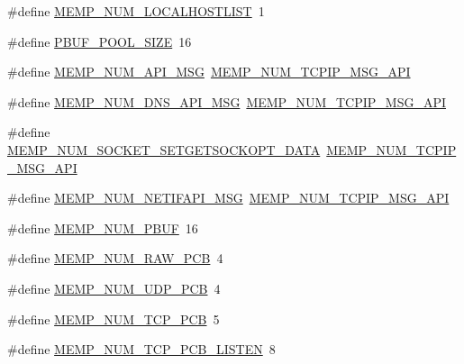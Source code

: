 \begin{DoxyCompactItemize}
\#define \hyperlink{group__lwip__opts__memp_gaa9b0f949da12cbe8fe5f7aefc30290e0}{M\+E\+M\+P\+\_\+\+N\+U\+M\+\_\+\+L\+O\+C\+A\+L\+H\+O\+S\+T\+L\+I\+ST}~1
\item 
\#define \hyperlink{group__lwip__opts__memp_ga50eaadc4cad0716410332691e382c38a}{P\+B\+U\+F\+\_\+\+P\+O\+O\+L\+\_\+\+S\+I\+ZE}~16
\item 
\#define \hyperlink{group__lwip__opts__memp_ga5a95abf3610c56e7c23cb035eb9c3444}{M\+E\+M\+P\+\_\+\+N\+U\+M\+\_\+\+A\+P\+I\+\_\+\+M\+SG}~\hyperlink{group__lwip__opts__memp_gafbbfd6ce8536038cd00fa85bebae987c}{M\+E\+M\+P\+\_\+\+N\+U\+M\+\_\+\+T\+C\+P\+I\+P\+\_\+\+M\+S\+G\+\_\+\+A\+PI}
\item 
\#define \hyperlink{group__lwip__opts__memp_ga3b1f228c598529c62895ad04ff294980}{M\+E\+M\+P\+\_\+\+N\+U\+M\+\_\+\+D\+N\+S\+\_\+\+A\+P\+I\+\_\+\+M\+SG}~\hyperlink{group__lwip__opts__memp_gafbbfd6ce8536038cd00fa85bebae987c}{M\+E\+M\+P\+\_\+\+N\+U\+M\+\_\+\+T\+C\+P\+I\+P\+\_\+\+M\+S\+G\+\_\+\+A\+PI}
\item 
\#define \hyperlink{group__lwip__opts__memp_gacf9782dd26bf8a655044dc041a9de948}{M\+E\+M\+P\+\_\+\+N\+U\+M\+\_\+\+S\+O\+C\+K\+E\+T\+\_\+\+S\+E\+T\+G\+E\+T\+S\+O\+C\+K\+O\+P\+T\+\_\+\+D\+A\+TA}~\hyperlink{group__lwip__opts__memp_gafbbfd6ce8536038cd00fa85bebae987c}{M\+E\+M\+P\+\_\+\+N\+U\+M\+\_\+\+T\+C\+P\+I\+P\+\_\+\+M\+S\+G\+\_\+\+A\+PI}
\item 
\#define \hyperlink{group__lwip__opts__memp_gadd5a973b98068ce9318ea2f96b5fa14c}{M\+E\+M\+P\+\_\+\+N\+U\+M\+\_\+\+N\+E\+T\+I\+F\+A\+P\+I\+\_\+\+M\+SG}~\hyperlink{group__lwip__opts__memp_gafbbfd6ce8536038cd00fa85bebae987c}{M\+E\+M\+P\+\_\+\+N\+U\+M\+\_\+\+T\+C\+P\+I\+P\+\_\+\+M\+S\+G\+\_\+\+A\+PI}
\item 
\#define \hyperlink{group__lwip__opts__memp_ga92b30aed958ec59334d936d4ca725418}{M\+E\+M\+P\+\_\+\+N\+U\+M\+\_\+\+P\+B\+UF}~16
\item 
\#define \hyperlink{group__lwip__opts__memp_ga379bf92ed322cda54cb701337421e0d3}{M\+E\+M\+P\+\_\+\+N\+U\+M\+\_\+\+R\+A\+W\+\_\+\+P\+CB}~4
\item 
\#define \hyperlink{group__lwip__opts__memp_ga2c416da481ab09bd1ba257b75a0707eb}{M\+E\+M\+P\+\_\+\+N\+U\+M\+\_\+\+U\+D\+P\+\_\+\+P\+CB}~4
\item 
\#define \hyperlink{group__lwip__opts__memp_ga73beecc19cfbc3114768f9b32b2cd70e}{M\+E\+M\+P\+\_\+\+N\+U\+M\+\_\+\+T\+C\+P\+\_\+\+P\+CB}~5
\item 
\#define \hyperlink{group__lwip__opts__memp_ga04fba6a249123513271dccb4ec26aa5a}{M\+E\+M\+P\+\_\+\+N\+U\+M\+\_\+\+T\+C\+P\+\_\+\+P\+C\+B\+\_\+\+L\+I\+S\+T\+EN}~8

\end{DoxyCompactItemize}
